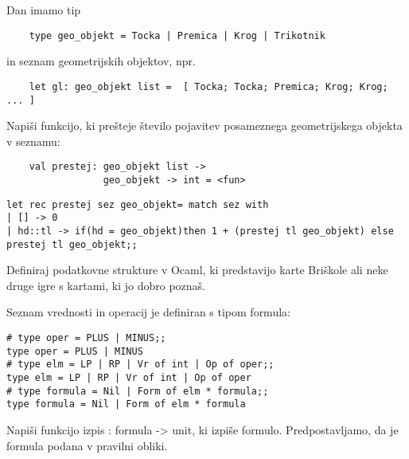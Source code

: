 \begin{ex}
Dan imamo tip 

\begin{lstlisting}
	type geo_objekt = Tocka | Premica | Krog | Trikotnik 
\end{lstlisting}
in seznam geometrijskih objektov, npr.

\begin{lstlisting}
	let gl: geo_objekt list =  [ Tocka; Tocka; Premica; Krog; Krog; ... ] 
\end{lstlisting}

Napi\v si funkcijo, ki pre\v steje \v stevilo pojavitev posameznega geometrijskega objekta v seznamu:

\begin{lstlisting}
	val prestej: geo_objekt list -> 
                 geo_objekt -> int = <fun>
\end{lstlisting}

\begin{sol}
\begin{lstlisting}
let rec prestej sez geo_objekt= match sez with
| [] -> 0
| hd::tl -> if(hd = geo_objekt)then 1 + (prestej tl geo_objekt) else prestej tl geo_objekt;;
\end{lstlisting}
\end{sol}

\end{ex}
\begin{ex}
Definiraj podatkovne strukture v Ocaml, ki predstavijo karte Bri\v skole ali neke druge igre s kartami, ki jo dobro pozna\v s.



\end{ex}
\begin{ex}
Seznam vrednosti in operacij je definiran s tipom formula: 
\begin{lstlisting}
# type oper = PLUS | MINUS;; 
type oper = PLUS | MINUS 
# type elm = LP | RP | Vr of int | Op of oper;; 
type elm = LP | RP | Vr of int | Op of oper 
# type formula = Nil | Form of elm * formula;; 
type formula = Nil | Form of elm * formula 
\end{lstlisting}


Napi\v si funkcijo izpis : formula -> unit, ki izpi\v se formulo. Predpostavljamo, da je formula podana v pravilni obliki.



\end{ex}
